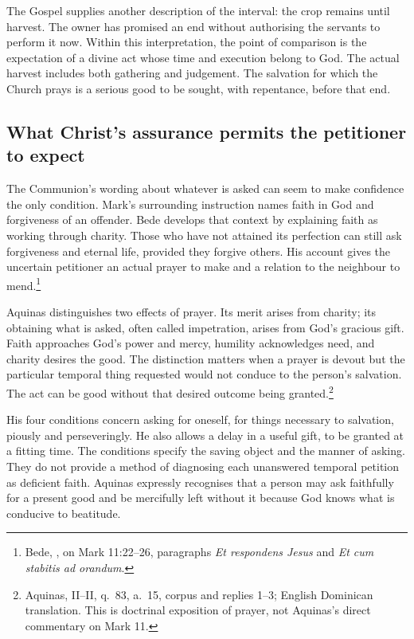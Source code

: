 The Gospel supplies another description of the interval: the crop
remains until harvest. The owner has promised an end without authorising
the servants to perform it now. Within this interpretation, the point
of comparison is the expectation of a divine act whose time and
execution belong to God. The actual harvest includes both gathering
and judgement. The salvation for which the Church prays is a serious
good to be sought, with repentance, before that end.

\subsection{What Christ's assurance permits the petitioner to expect}
The Communion's wording about whatever is asked can seem to make
confidence the only condition. Mark's surrounding instruction names
faith in God and forgiveness of an offender. Bede develops that
context by explaining faith as working through charity. Those who
have not attained its perfection can still ask forgiveness and eternal
life, provided they forgive others. His account gives the uncertain
petitioner an actual prayer to make and a relation to the neighbour
to mend.\footnote{Bede, , on Mark 11:22--26,
paragraphs \textit{Et respondens Jesus} and \textit{Et cum stabitis ad orandum}.}

Aquinas distinguishes two effects of prayer. Its merit arises from
charity; its obtaining what is asked, often called impetration,
arises from God's gracious gift. Faith approaches God's power and
mercy, humility acknowledges need, and charity desires the good.
The distinction matters when a prayer is devout but the particular
temporal thing requested would not conduce to the person's salvation.
The act can be good without that desired outcome being granted.\footnote{Aquinas,
 II--II, q.~83, a.~15, corpus and replies 1--3;
English Dominican translation. This is doctrinal exposition of prayer,
not Aquinas's direct commentary on Mark 11.}

His four conditions concern asking for oneself, for things necessary
to salvation, piously and perseveringly. He also allows a delay in a
useful gift, to be granted at a fitting time. The conditions specify
the saving object and the manner of asking. They do not provide a
method of diagnosing each unanswered temporal petition as deficient
faith. Aquinas expressly recognises that a person may ask faithfully
for a present good and be mercifully left without it because God
knows what is conducive to beatitude.

